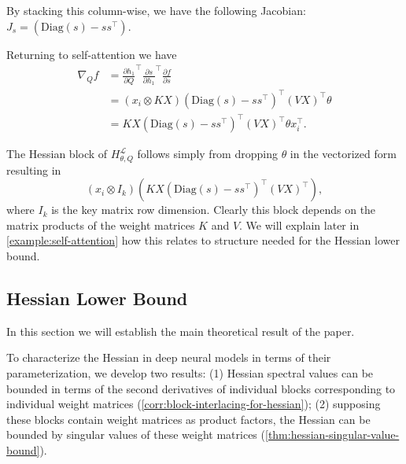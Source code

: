 \documentclass{article}
\theoremstyle{plain}
\theoremstyle{definition}
\theoremstyle{remark}
\begin{document}
By stacking this column-wise, we have the following Jacobian: \(J_{s} = \left(\mathrm{Diag}(s) - ss^\top \right).\)

Returning to self-attention we have  
\begin{align*}
\nabla_Q f &=  \frac{\partial h_1}{\partial Q}^{\top} \frac{\partial s}{\partial h_1} ^{\top} \frac{\partial f}{\partial s} \\
 &=   (x_i \otimes KX) 
\left(\mathrm{Diag}(s) - ss^\top \right)^\top
 (VX)^\top \theta \\ %
 &=    KX 
\left(\mathrm{Diag}(s) - ss^\top \right)^{\top} 
 (VX)^{\top} \theta x_i^{\top}.
\end{align*}

The Hessian block of $H_{\theta, Q}^{\mathcal{L}}$ follows simply from dropping $\theta$ in the vectorized form resulting in \[
(x_i \otimes I_k) \left( KX 
\left(\mathrm{Diag}(s) - ss^\top \right)^{\top}
 (VX)^\top \right),
\] where $I_k$ is the key matrix row dimension. Clearly this block depends on the matrix products of the weight matrices $K$ and $V$. We will explain later in \cref{example:self-attention} how this relates to structure needed for the Hessian lower bound.

\subsection{Hessian Lower Bound}
\label{app:hessian-lower-bound}

In this section we will establish the main theoretical result of the paper. 

To characterize the Hessian in deep neural models in terms of their parameterization, we develop two results: (1) Hessian spectral values can be bounded in terms of the second derivatives of individual blocks corresponding to individual weight matrices (\cref{corr:block-interlacing-for-hessian}); (2) supposing these blocks contain weight matrices as product factors, the Hessian can be bounded by singular values of these weight matrices (\cref{thm:hessian-singular-value-bound}).
\end{document}
